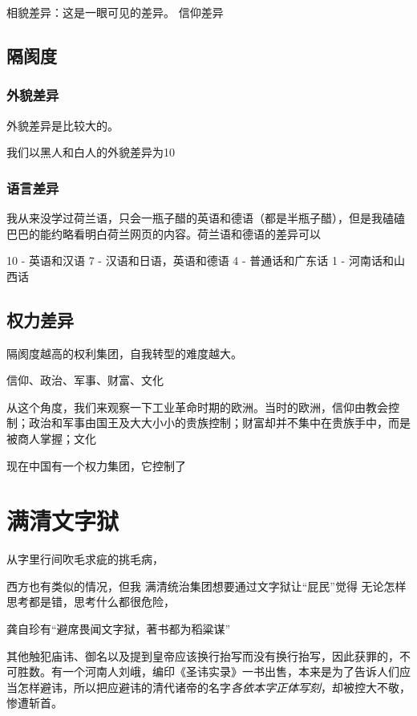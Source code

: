 相貌差异：这是一眼可见的差异。
信仰差异

\subsection{隔阂度}

\subsubsection{外貌差异}
外貌差异是比较大的。

我们以黑人和白人的外貌差异为10

\subsubsection{语言差异}


我从来没学过荷兰语，只会一瓶子醋的英语和德语（都是半瓶子醋），但是我磕磕巴巴的能约略看明白荷兰网页的内容。荷兰语和德语的差异可以

10 - 英语和汉语
7 - 汉语和日语，英语和德语
4 - 普通话和广东话
1 - 河南话和山西话



\subsection{权力差异}


隔阂度越高的权利集团，自我转型的难度越大。

信仰、政治、军事、财富、文化

从这个角度，我们来观察一下工业革命时期的欧洲。当时的欧洲，信仰由教会控制；政治和军事由国王及大大小小的贵族控制；财富却并不集中在贵族手中，而是被商人掌握；文化

现在中国有一个权力集团，它控制了




\section{满清文字狱}
从字里行间吹毛求疵的挑毛病，

西方也有类似的情况，但我
满清统治集团想要通过文字狱让“屁民”觉得
无论怎样思考都是错，思考什么都很危险，

龚自珍有“避席畏闻文字狱，著书都为稻粱谋”

其他触犯庙讳、御名以及提到皇帝应该换行抬写而没有换行抬写，因此获罪的，不可胜数。有一个河南人刘峨，编印《圣讳实录》一书出售，本来是为了告诉人们应当怎样避讳，所以把应避讳的清代诸帝的名字\textit{各依本字正体写刻}，却被控大不敬，惨遭斩首。 

